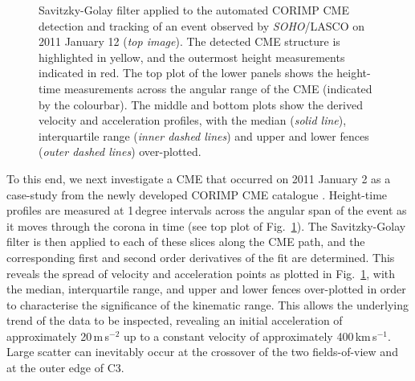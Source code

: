 \documentclass[structabstract]{aa}
\begin{document}
\begin{figure}[!t]
\caption{Savitzky-Golay filter applied to the automated CORIMP CME detection and tracking of an event observed by \emph{SOHO}/LASCO on 2011 January 12 (\emph{top image}). The detected CME structure is highlighted in yellow, and the outermost height measurements indicated in red. The top plot of the lower panels shows the height-time measurements across the angular range of the CME (indicated by the colourbar). The middle and bottom plots show the derived velocity and acceleration profiles, with the median (\emph{solid line}), interquartile range (\emph{inner dashed lines}) and upper and lower fences (\emph{outer dashed lines}) over-plotted.}
\label{fig_savgol_CME_CORIMP}
\end{figure}

To this end, we next investigate a CME that occurred on 2011 January 2 as a case-study from the newly developed CORIMP CME catalogue \citep{2012ApJ...752..144M, 2012ApJ...752..145B}. Height-time profiles are measured at 1\,degree intervals across the angular span of the event as it moves through the corona in time (see top plot of Fig.~\ref{fig_savgol_CME_CORIMP}). The Savitzky-Golay filter is then applied to each of these slices along the CME path, and the corresponding first and second order derivatives of the fit are determined. This reveals the spread of velocity and acceleration points as plotted in Fig.~\ref{fig_savgol_CME_CORIMP}, with the median, interquartile range, and upper and lower fences over-plotted in order to characterise the significance of the kinematic range. This allows the underlying trend of the data to be inspected, revealing an initial acceleration of approximately 20\,m\,s$^{-2}$ up to a constant velocity of approximately 400\,km\,s$^{-1}$. Large scatter can inevitably occur at the crossover of the two fields-of-view and at the outer edge of C3.
\end{document}
